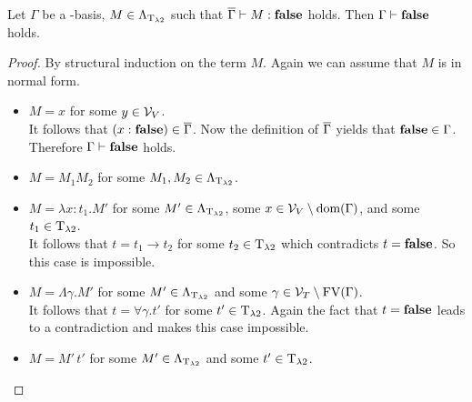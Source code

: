\begin{lemma}
Let $\Gamma$ be a \SysP-basis, $M\in\Lambda_{\text{T}_{\lambda2}}$ such that $\overline{\Gamma}\vdash M:\textbf{false}$ holds. Then $\Gamma\vdash\textbf{false}$ holds.
\end{lemma}
\begin{proof}
By structural induction on the term $M$.
Again we can assume that $M$ is in normal form.
\begin{itemize}
	\item[] \underline{$M=x$} for some $y\in\mathcal{V}_V$.\\
		It follows that $(x:\textbf{false})\in\overline{\Gamma}$. Now the definition of $\overline{\Gamma}$ yields that $\textbf{false}\in\Gamma$. Therefore $\Gamma\vdash \textbf{false}$ holds.
	\item[] \underline{$M=M_1M_2$} for some $M_1,M_2\in\Lambda_{\text{T}_{\lambda2}}$.\\
		
		\begin{figure}[H]
			\centering
			
		\end{figure}
	\item[] \underline{$M=\lambda x:t_1.M'$} for some $M'\in\Lambda_{\text{T}_{\lambda2}}$, some $x\in\mathcal{V}_V\setminus\text{dom}(\Gamma)$, and some $t_1\in\text{T}_{\lambda2}$.\\
		It follows that $t=t_1\to t_2$ for some $t_2\in\text{T}_{\lambda2}$ which contradicts $t=\textbf{false}$. So this case is impossible.

	\item[] \underline{$M=\Lambda\gamma.M'$} for some $M'\in\Lambda_{\text{T}_{\lambda2}}$ and some $\gamma\in\mathcal{V}_T\setminus\text{FV}(\Gamma)$.\\
		It follows that $t=\forall\gamma.t'$ for some $t'\in\text{T}_{\lambda2}$. Again the fact that $t=\textbf{false}$ leads to a contradiction and makes this case impossible.
		

	\item[] \underline{$M=M'\,t'$} for some $M'\in\Lambda_{\text{T}_{\lambda2}}$ and some $t'\in\text{T}_{\lambda2}$.\\
		
\end{itemize}
\end{proof}